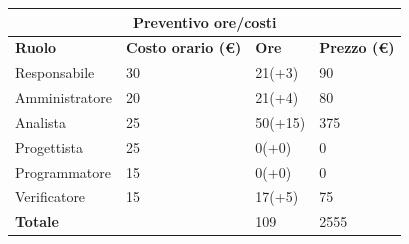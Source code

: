 \documentclass[a4paper, 12pt]{article}
\begin{document}
\begin{center}
	\begin{tabularx}{\textwidth}{|X|X|X|X|}
		\hline
		\multicolumn{4}{|c|}{\textbf{Preventivo ore/costi}}                                      \\
		\hline
		\hline
		\textbf{Ruolo}  & \textbf{Costo orario (\euro)} & \textbf{Ore} & \textbf{Prezzo (\euro)} \\
		\hline
		Responsabile    & 30                            & 21(+3)       & 90                      \\
		\hline
		Amministratore  & 20                            & 21(+4)       & 80                      \\
		\hline
		Analista        & 25                            & 50(+15)      & 375                     \\
		\hline
		Progettista     & 25                            & 0(+0)        & 0                       \\
		\hline
		Programmatore   & 15                            & 0(+0)        & 0                       \\
		\hline
		Verificatore    & 15                            & 17(+5)       & 75                      \\
		\hline
		\hline
		\textbf{Totale} &                               & 109          & 2555                    \\
		\hline
	\end{tabularx}\\[8pt]
	\mbox{}\\
\end{center}
\end{document}
